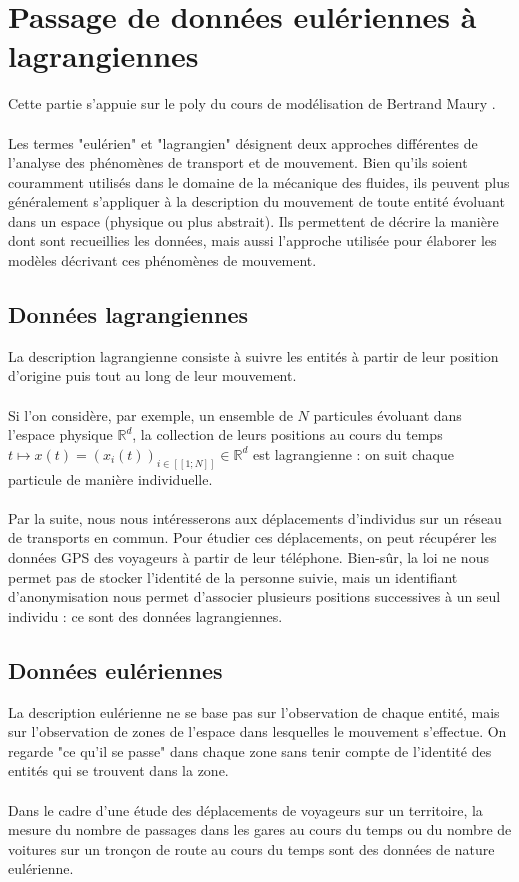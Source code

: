 \documentclass[12pt]{article}
\newcommand{\R}{\mathbb{R}}
\newcommand{\dcrochetg}{[\![}
\newcommand{\dcrochetd}{]\!]}
\begin{document}
\section{Passage de données eulériennes à lagrangiennes}
Cette partie s'appuie sur le poly du cours de modélisation de Bertrand Maury \cite{poly_bertrand_maury}.\\
\\
Les termes "eulérien" et "lagrangien" désignent deux approches différentes de l'analyse des phénomènes de transport et de mouvement. Bien qu'ils soient couramment utilisés dans le domaine de la mécanique des fluides, ils peuvent plus généralement s'appliquer à la description du mouvement de toute entité évoluant dans un espace (physique ou plus abstrait). Ils permettent de décrire la manière dont sont recueillies les données, mais aussi l'approche utilisée pour élaborer les modèles décrivant ces phénomènes de mouvement.
\subsection{Données lagrangiennes}
La description lagrangienne consiste à suivre les entités à partir de leur position d'origine puis tout au long de leur mouvement.\\
\\
Si l'on considère, par exemple, un ensemble de $N$ particules évoluant dans l'espace physique $\mathbb{R}^d$, la collection de leurs positions au cours du temps $t \mapsto x(t) = (x_i(t))_{i \in \dcrochetg1;N\dcrochetd} \in \R^d $ est lagrangienne : on suit chaque particule de manière individuelle.\\
\\
Par la suite, nous nous intéresserons aux déplacements d'individus sur un réseau de transports en commun. Pour étudier ces déplacements, on peut récupérer les données GPS des voyageurs à partir de leur téléphone. Bien-sûr, la loi ne nous permet pas de stocker l'identité de la personne suivie, mais un identifiant d'anonymisation nous permet d'associer plusieurs positions successives à un seul individu : ce sont des données lagrangiennes.
\subsection{Données eulériennes}
La description eulérienne ne se base pas sur l'observation de chaque entité, mais sur l'observation de zones de l'espace dans lesquelles le mouvement s'effectue. On regarde "ce qu'il se passe" dans chaque zone sans tenir compte de l'identité des entités qui se trouvent dans la zone.\\
\\
Dans le cadre d'une étude des déplacements de voyageurs sur un territoire, la mesure du nombre de passages dans les gares au cours du temps ou du nombre de voitures sur un tronçon de route au cours du temps sont des données de nature eulérienne.
\end{document}
